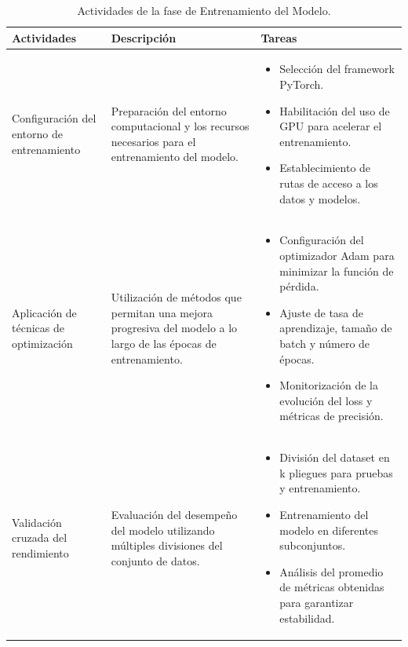 \vspace{2ex}
\begingroup
\renewcommand\arraystretch{1.2}
\begin{longtable}{>{\raggedright\arraybackslash}p{4cm} >{\raggedright\arraybackslash}p{6cm} >{\raggedright\arraybackslash}p{6cm}}
\caption{Actividades de la fase de Entrenamiento del Modelo.}
\label{tabla:entrenamiento_modelo}\\
\toprule
\centering\textbf{Actividades} & \centering\textbf{Descripción} & \centering\textbf{Tareas} \tabularnewline
\midrule
\endfirsthead

\bottomrule
\endfoot

Configuración del entorno de entrenamiento &
Preparación del entorno computacional y los recursos necesarios para el entrenamiento del modelo. &
\begin{itemize}
    \item Selección del framework PyTorch.
    \item Habilitación del uso de GPU para acelerar el entrenamiento.
    \item Establecimiento de rutas de acceso a los datos y modelos.
\end{itemize} \\[2ex]

Aplicación de técnicas de optimización &
Utilización de métodos que permitan una mejora progresiva del modelo a lo largo de las épocas de entrenamiento. &
\begin{itemize}
    \item Configuración del optimizador Adam para minimizar la función de pérdida.
    \item Ajuste de tasa de aprendizaje, tamaño de batch y número de épocas.
    \item Monitorización de la evolución del loss y métricas de precisión.
\end{itemize} \\[2ex]

Validación cruzada del rendimiento &
Evaluación del desempeño del modelo utilizando múltiples divisiones del conjunto de datos. &
\begin{itemize}
    \item División del dataset en k pliegues para pruebas y entrenamiento.
    \item Entrenamiento del modelo en diferentes subconjuntos.
    \item Análisis del promedio de métricas obtenidas para garantizar estabilidad.
\end{itemize} \\

\end{longtable}
\endgroup



